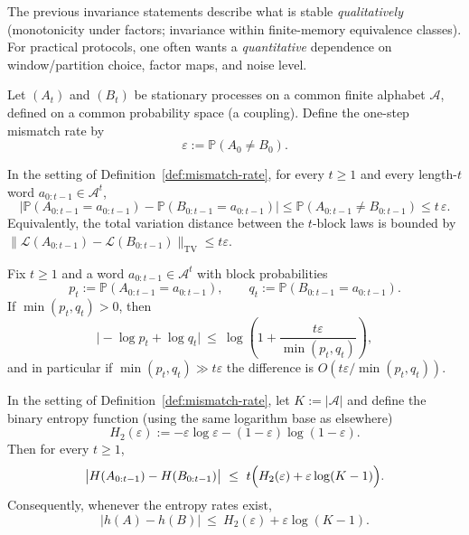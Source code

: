 The previous invariance statements describe what is stable \emph{qualitatively} (monotonicity under factors; invariance within finite-memory equivalence classes). For practical protocols, one often wants a \emph{quantitative} dependence on window/partition choice, factor maps, and noise level.

\begin{definition}\label{def:mismatch-rate}
Let $(A_t)$ and $(B_t)$ be stationary processes on a common finite alphabet $\mathcal{A}$, defined on a common probability space (a coupling). Define the one-step mismatch rate by
\[
\varepsilon:=\mathbb{P}(A_0\neq B_0).
\]
\end{definition}

\begin{proposition}\label{prop:block-tv-by-mismatch}
In the setting of Definition~\ref{def:mismatch-rate}, for every $t\ge 1$ and every length-$t$ word $a_{0:t-1}\in\mathcal{A}^t$,
\[
\bigl|\mathbb{P}(A_{0:t-1}=a_{0:t-1})-\mathbb{P}(B_{0:t-1}=a_{0:t-1})\bigr|
\le \mathbb{P}(A_{0:t-1}\neq B_{0:t-1})
\le t\,\varepsilon.
\]
Equivalently, the total variation distance between the $t$-block laws is bounded by $\lVert \mathcal{L}(A_{0:t-1})-\mathcal{L}(B_{0:t-1})\rVert_{\mathrm{TV}}\le t\varepsilon$.
\end{proposition}

\begin{corollary}\label{cor:tau-stability-finite-t}
Fix $t\ge 1$ and a word $a_{0:t-1}\in\mathcal{A}^t$ with block probabilities
\[
p_t:=\mathbb{P}(A_{0:t-1}=a_{0:t-1}),\qquad q_t:=\mathbb{P}(B_{0:t-1}=a_{0:t-1}).
\]
If $\min(p_t,q_t)>0$, then
\[
\bigl|-\log p_t + \log q_t\bigr|\ \le\ \log\!\left(1+\frac{t\varepsilon}{\min(p_t,q_t)}\right),
\]
and in particular if $\min(p_t,q_t)\gg t\varepsilon$ the difference is $O(t\varepsilon/\min(p_t,q_t))$.
\end{corollary}

\begin{proposition}\label{prop:entropy-continuity-mismatch}
In the setting of Definition~\ref{def:mismatch-rate}, let $K:=|\mathcal{A}|$ and define the binary entropy function (using the same logarithm base as elsewhere)
\[
H_2(\varepsilon):=-\varepsilon\log\varepsilon-(1-\varepsilon)\log(1-\varepsilon).
\]
Then for every $t\ge 1$,
\[
\bigl|H(A_{0:t-1})-H(B_{0:t-1})\bigr|\ \le\ t\Bigl(H_2(\varepsilon)+\varepsilon\log(K-1)\Bigr).
\]
Consequently, whenever the entropy rates exist,
\[
\bigl|h(A)-h(B)\bigr|\ \le\ H_2(\varepsilon)+\varepsilon\log(K-1).
\]
\cite{CoverThomas2006}
\end{proposition}


